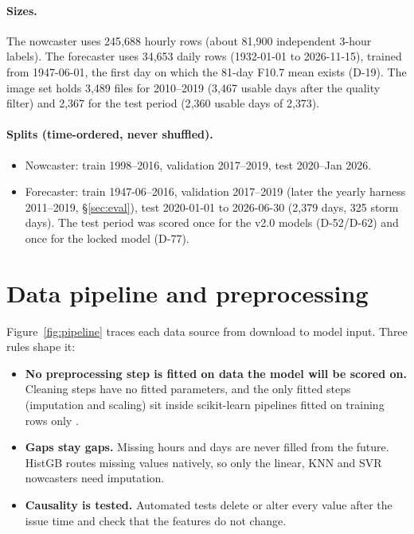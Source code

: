 \documentclass[11pt,a4paper]{article}
\begin{document}
\paragraph{Sizes.} The nowcaster uses 245{,}688 hourly rows (about 81{,}900 independent 3-hour labels). The
forecaster uses 34{,}653 daily rows (1932-01-01 to 2026-11-15), trained from 1947-06-01, the first day on which the
81-day F10.7 mean exists (D-19). The image set holds 3{,}489 files for 2010--2019 (3{,}467 usable days after the
quality filter) and 2{,}367 for the test period (2{,}360 usable days of 2{,}373).

\paragraph{Splits (time-ordered, never shuffled).}
\begin{itemize}
\item Nowcaster: train 1998--2016, validation 2017--2019, test 2020--Jan 2026.
\item Forecaster: train 1947-06--2016, validation 2017--2019 (later the yearly harness 2011--2019, \S\ref{sec:eval}),
test 2020-01-01 to 2026-06-30 (2{,}379 days, 325 storm days). The test period was scored once for the v2.0 models
(D-52/D-62) and once for the locked model (D-77).
\end{itemize}

\section{Data pipeline and preprocessing}\label{sec:pipeline}
Figure~\ref{fig:pipeline} traces each data source from download to model input. Three rules shape it:
\begin{itemize}
\item \textbf{No preprocessing step is fitted on data the model will be scored on.} Cleaning steps have no fitted
parameters, and the only fitted steps (imputation and scaling) sit inside scikit-learn pipelines fitted on training
rows only \cite{pedregosa2011}.
\item \textbf{Gaps stay gaps.} Missing hours and days are never filled from the future. HistGB routes missing values
natively, so only the linear, KNN and SVR nowcasters need imputation.
\item \textbf{Causality is tested.} Automated tests delete or alter every value after the issue time and check that
the features do not change.
\end{itemize}
\end{document}
